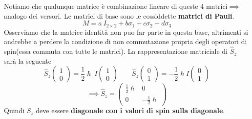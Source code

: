 Notiamo che qualunque matrice è combinazione lineare di queste 4
matrici\(\implies\) analogo dei versori.
Le matrici di base sono le
cossiddette \textbf{matrici di Pauli}. \[
                                           M = a \ I_{2 \times 2} + b \sigma_{1} + c \sigma_{2} + d \sigma_{3}
\] Osserviamo che la matrice identità non puo far parte in questa base,
altrimenti si andrebbe a perdere la condizione di non commutazione
propria degli operatori di spin(essa commuta con tutte le matrici).
La
rappresentazione matriciale di \(\hat{S}_{z}\) sarà la seguente \[
                                                                    \hat{S}_{z} \begin{pmatrix}
                                                                                    1  \\
                                                                                    0
                                                                    \end{pmatrix} =
                                                                    \frac{1}{2} \hslash \ I
                                                                    \begin{pmatrix}
                                                                        1 \\
                                                                        0
                                                                    \end{pmatrix}
                                                                    \qquad
                                                                    \hat{S}_{z} \begin{pmatrix}
                                                                                    0  \\
                                                                                    1
                                                                    \end{pmatrix}
                                                                    = - \frac{1}{2} \hslash I \begin{pmatrix}
                                                                                                  0 \\
                                                                                                  1
                                                                    \end{pmatrix}
\] \[
       \implies
       \hat{S}_{z} =
       \begin{pmatrix}
           \frac{1}{2} \hslash & 0  \\
           0 & - \frac{1}{2} \hslash
       \end{pmatrix}
\] Quindi \(\hat{S}_{z}\) deve essere \textbf{diagonale con i valori di
spin sulla diagonale}.
